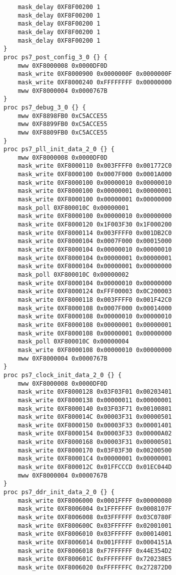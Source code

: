 \begin{lstlisting}
    mask_delay 0XF8F00200 1
    mask_delay 0XF8F00200 1
    mask_delay 0XF8F00200 1
    mask_delay 0XF8F00200 1
    mask_delay 0XF8F00200 1
}
proc ps7_post_config_3_0 {} {
	mww 0XF8000008 0x0000DF0D
    mask_write 0XF8000900 0x0000000F 0x0000000F
    mask_write 0XF8000240 0xFFFFFFFF 0x00000000
	mww 0XF8000004 0x0000767B
}
proc ps7_debug_3_0 {} {
	mww 0XF8898FB0 0xC5ACCE55
	mww 0XF8899FB0 0xC5ACCE55
	mww 0XF8809FB0 0xC5ACCE55
}
proc ps7_pll_init_data_2_0 {} {
    mww 0XF8000008 0x0000DF0D
    mask_write 0XF8000110 0x003FFFF0 0x001772C0
    mask_write 0XF8000100 0x0007F000 0x0001A000
    mask_write 0XF8000100 0x00000010 0x00000010
    mask_write 0XF8000100 0x00000001 0x00000001
    mask_write 0XF8000100 0x00000001 0x00000000
    mask_poll 0XF800010C 0x00000001
    mask_write 0XF8000100 0x00000010 0x00000000
    mask_write 0XF8000120 0x1F003F30 0x1F000200
    mask_write 0XF8000114 0x003FFFF0 0x001DB2C0
    mask_write 0XF8000104 0x0007F000 0x00015000
    mask_write 0XF8000104 0x00000010 0x00000010
    mask_write 0XF8000104 0x00000001 0x00000001
    mask_write 0XF8000104 0x00000001 0x00000000
    mask_poll 0XF800010C 0x00000002
    mask_write 0XF8000104 0x00000010 0x00000000
    mask_write 0XF8000124 0xFFF00003 0x0C200003
    mask_write 0XF8000118 0x003FFFF0 0x001F42C0
    mask_write 0XF8000108 0x0007F000 0x00014000
    mask_write 0XF8000108 0x00000010 0x00000010
    mask_write 0XF8000108 0x00000001 0x00000001
    mask_write 0XF8000108 0x00000001 0x00000000
    mask_poll 0XF800010C 0x00000004
    mask_write 0XF8000108 0x00000010 0x00000000
    mww 0XF8000004 0x0000767B
}
proc ps7_clock_init_data_2_0 {} {
    mww 0XF8000008 0x0000DF0D
    mask_write 0XF8000128 0x03F03F01 0x00203401
    mask_write 0XF8000138 0x00000011 0x00000001
    mask_write 0XF8000140 0x03F03F71 0x00100801
    mask_write 0XF800014C 0x00003F31 0x00000501
    mask_write 0XF8000150 0x00003F33 0x00001401
    mask_write 0XF8000154 0x00003F33 0x00000A02
    mask_write 0XF8000168 0x00003F31 0x00000501
    mask_write 0XF8000170 0x03F03F30 0x00200500
    mask_write 0XF80001C4 0x00000001 0x00000001
    mask_write 0XF800012C 0x01FFCCCD 0x01EC044D
    mww 0XF8000004 0x0000767B
}
proc ps7_ddr_init_data_2_0 {} {
    mask_write 0XF8006000 0x0001FFFF 0x00000080
    mask_write 0XF8006004 0x1FFFFFFF 0x0008107F
    mask_write 0XF8006008 0x03FFFFFF 0x03C0780F
    mask_write 0XF800600C 0x03FFFFFF 0x02001001
    mask_write 0XF8006010 0x03FFFFFF 0x00014001
    mask_write 0XF8006014 0x001FFFFF 0x0004151A
    mask_write 0XF8006018 0xF7FFFFFF 0x44E354D2
    mask_write 0XF800601C 0xFFFFFFFF 0x720238E5
    mask_write 0XF8006020 0xFFFFFFFC 0x272872D0

\end{lstlisting}
